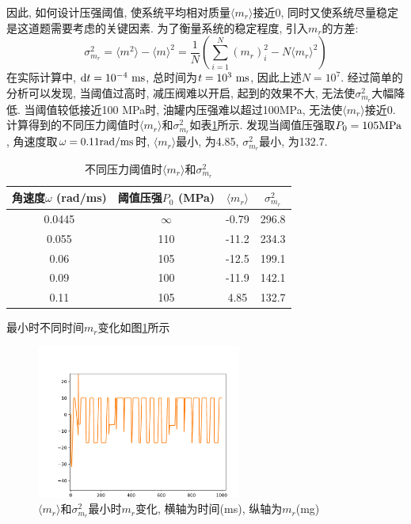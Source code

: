 \documentclass{cumcmthesis}
\renewcommand\d{\mathop{}\!\mathrm{d}}
\newcommand\bkt[1]{\langle {#1} \rangle}
\begin{document}
因此, 如何设计压强阈值, 使系统平均相对质量$\bkt{m_r}$接近0, 同时又使系统尽量稳定是这道题需要考虑的关键因素. 为了衡量系统的稳定程度, 引入$m_r$的方差:
$$\sigma_{m_r}^2 = \bkt{m^2}-\bkt{m}^2=\frac{1}{N}\left(\sum_{i=1}^{N} (m_r)_{i}^{2}-N \bkt{m_r}^{2}\right)$$
在实际计算中, $\d t = 10^{-4}\ \rm{ms}$, 总时间为$t = 10^3\ \rm{ms}$, 因此上述$N=10^7$. 经过简单的分析可以发现, 当阈值过高时, 减压阀难以开启, 起到的效果不大, 无法使$\sigma_{m_r}^2$大幅降低. 当阈值较低接近100 MPa时, 油罐内压强难以超过100MPa, 无法使$\bkt{m_r}$接近0. 计算得到的不同压力阈值时$\bkt{m_r}$和$\sigma_{m_r}^2$如表\ref{yuzhiyaqiang}所示. 发现当阈值压强取$P_0=105 \rm{MPa}$, 角速度取$\omega=0.11 \rm{rad/ms}$时, $\bkt{m_r}$最小, 为4.85, $\sigma_{m_r}^2$最小, 为132.7. 

\begin{table}[htbp]
    \centering
    \begin{tabular}{|c|c|c|c|}
        \hline
    角速度$\omega$ (rad/ms) & 阈值压强$P_0$ (MPa) & $\bkt{m_r}$& $\sigma_{m_r}^2$\\ \hline
    0.0445               & $\infty$        & -0.79                                                        & 296.8                                                                \\ \hline
    0.055                & 110             & -11.2                                                        & 234.3                                                                \\ \hline
    0.06                 & 105             & -12.5                                                        & 199.1                                                                 \\ \hline
    0.09                 & 100             & -11.9                                                        & 142.1   \\ \hline
    0.11                 & 105             & 4.85                                                        & 132.7   \\ \hline
    \end{tabular}
    \caption{不同压力阈值时$\bkt{m_r}$和$\sigma_{m_r}^2$}
    \label{yuzhiyaqiang}
    \end{table}

最小时不同时间$m_r$变化如图\ref{p0_10}所示

\begin{figure}[htbp]
    \centering
    \includegraphics[width=0.6\textwidth]{p0_10.pdf} 
    \caption{$\bkt{m_r}$和$\sigma_{m_r}^2$最小时$m_r$变化, 横轴为时间(ms), 纵轴为$m_r$(mg)}
    \label{p0_10}
\end{figure}
\end{document}
